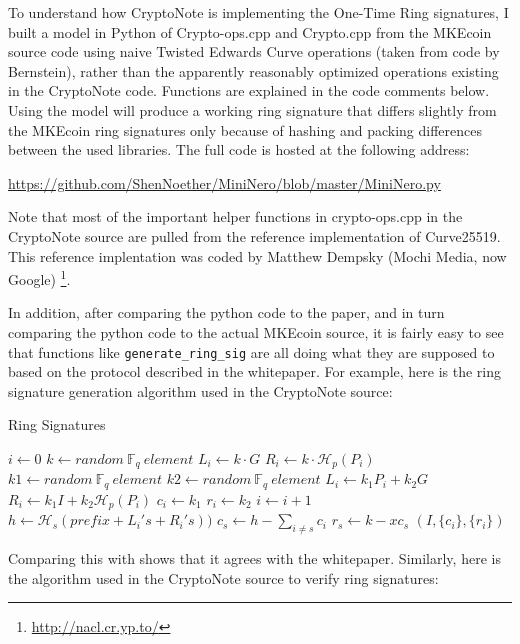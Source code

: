 \documentclass[12pt,english]{mrl}
\numberwithin{equation}{section}
\numberwithin{figure}{section}
\begin{document}
To understand how CryptoNote is implementing the One-Time Ring signatures,
I built a model in Python of Crypto-ops.cpp and Crypto.cpp from the MKEcoin source
code using naive Twisted Edwards Curve operations (taken
from code by Bernstein), rather than the apparently reasonably optimized
operations existing in the CryptoNote code. Functions
are explained in the code comments below. Using the model will produce
a working ring signature that differs slightly from the MKEcoin ring
signatures only because of hashing and packing differences between
the used libraries. The full code is hosted at the following address: 
\begin{center}
\url{https://github.com/ShenNoether/MiniNero/blob/master/MiniNero.py}
\end{center}
Note that most of the important helper functions in crypto-ops.cpp in the CryptoNote source
are pulled from the reference implementation of Curve25519. This reference
implentation was coded by Matthew Dempsky (Mochi Media, now Google)%
\footnote{\url{http://nacl.cr.yp.to/}%
}. 

In addition, after comparing the python code to the paper, and in
turn comparing the python code to the actual MKEcoin source, it is
fairly easy to see that functions like \texttt{generate\_ring\_sig} are
all doing what they are supposed to based on the protocol described
in the whitepaper. For example, here is the ring signature generation algorithm
used in the CryptoNote source:

\begin{algorithm}[H]
\caption{Ring Signatures}


\begin{algorithmic} 
\State $i\gets 0$
		\State $k \gets random\ \mathbb{F}_q\  element$       
		\State $L_i \gets k \cdot G$
		\State $R_i \gets k\cdot \mathcal{H}_p(P_i)$
	\Else
		\State $k1 \gets random\ \mathbb{F}_q\  element$
		\State $k2 \gets random\ \mathbb{F}_q\  element$
		\State $L_i\gets k_1 P_i + k_2  G$
		\State $R_i\gets k_1 I+k_2 \mathcal{H}_p(P_i)$
		\State $c_i \gets k_1$
		\State $r_i \gets k_2$
	\EndIf 
	\State $i \gets i+1$
\EndWhile
\State $h \gets \mathcal{H}_s(prefix+L_i's+R_i's))$
\State $c_{s} \gets h-\sum_{i\neq s} c_i$
\State $r_s \gets k - x c_s$
\State \Return $(I, \{c_{i}\}, \{r_i\})$
\end{algorithmic} 
\end{algorithm}


Comparing this with \cite{CN} shows that it agrees with the whitepaper.
Similarly, here is the algorithm used in the CryptoNote source
to verify ring signatures:
\end{document}
